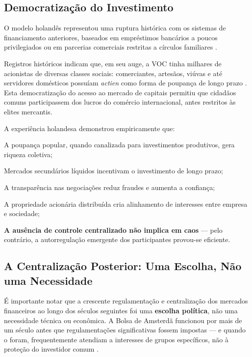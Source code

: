 \subsection{Democratização do Investimento}

O modelo holandês representou uma ruptura histórica com os sistemas de financiamento anteriores, baseados em empréstimos bancários a poucos privilegiados ou em parcerias comerciais restritas a círculos familiares \cite{gelderblom2013}.

Registros históricos indicam que, em seu auge, a VOC tinha milhares de acionistas de diversas classes sociais: comerciantes, artesãos, viúvas e até servidores domésticos possuíam \textit{actien} como forma de poupança de longo prazo \cite{petram2014}. Esta democratização do acesso ao mercado de capitais permitiu que cidadãos comuns participassem dos lucros do comércio internacional, antes restritos às elites mercantis.

A experiência holandesa demonstrou empiricamente que:

\begin{alineas}
    \item A poupança popular, quando canalizada para investimentos produtivos, gera riqueza coletiva;
    \item Mercados secundários líquidos incentivam o investimento de longo prazo;
    \item A transparência nas negociações reduz fraudes e aumenta a confiança;
    \item A propriedade acionária distribuída cria alinhamento de interesses entre empresa e sociedade;
    \item \textbf{A ausência de controle centralizado não implica em caos} --- pelo contrário, a autorregulação emergente dos participantes provou-se eficiente.
\end{alineas}

\subsection{A Centralização Posterior: Uma Escolha, Não uma Necessidade}

É importante notar que a crescente regulamentação e centralização dos mercados financeiros ao longo dos séculos seguintes foi uma \textbf{escolha política}, não uma necessidade técnica ou econômica. A Bolsa de Amsterdã funcionou por mais de um século antes que regulamentações significativas fossem impostas --- e quando o foram, frequentemente atendiam a interesses de grupos específicos, não à proteção do investidor comum \cite{dejong2005}.

